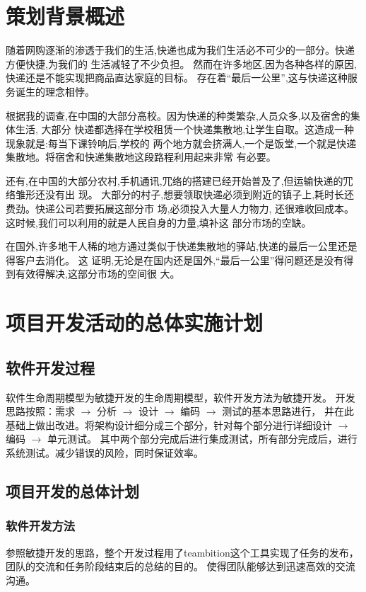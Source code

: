 \documentclass[UTF8]{dingo}
\begin{document}
  \section{策划背景概述}
    随着网购逐渐的渗透于我们的生活,快递也成为我们生活必不可少的一部分。快递方便快捷,为我们的 生活减轻了不少负担。
    然而在许多地区,因为各种各样的原因,快递还是不能实现把商品直达家庭的目标。
    存在着“最后一公里”,这与快递这种服务诞生的理念相悖。

    根据我的调查,在中国的大部分高校。因为快递的种类繁杂,人员众多,以及宿舍的集体生活,
    大部分 快递都选择在学校租赁一个快递集散地,让学生自取。这造成一种现象就是:每当下课铃响后,学校的
    两个地方就会挤满人,一个是饭堂,一个就是快递集散地。将宿舍和快递集散地这段路程利用起来非常 有必要。

    还有,在中国的大部分农村,手机通讯,⺴络的搭建已经开始普及了,但运输快递的⺴络雏形还没有出 现。
    大部分的村子,想要领取快递必须到附近的镇子上,耗时⻓还费劲。快递公司若要拓展这部分市 场,必须投入大量人力物力,
    还很难收回成本。这时候,我们可以利用的就是人民自身的力量,填补这 部分市场的空缺。

    在国外,许多地干人稀的地方通过类似于快递集散地的驿站,快递的最后一公里还是得客户去消化。
    这 证明,无论是在国内还是国外,“最后一公里”得问题还是没有得到有效得解决,这部分市场的空间很 大。

  \section{项目开发活动的总体实施计划}
    \subsection{软件开发过程}
      软件生命周期模型为敏捷开发的生命周期模型，软件开发方法为敏捷开发。
      开发思路按照：需求 $\rightarrow$ 分析  $\rightarrow$ 设计  $\rightarrow$ 编码  $\rightarrow$ 测试的基本思路进行，
      并在此基础上做出改进。将架构设计细分成三个部分，针对每个部分进行详细设计 $\rightarrow$ 编码 $\rightarrow$ 单元测试。
      其中两个部分完成后进行集成测试，所有部分完成后，进行系统测试。减少错误的风险，同时保证效率。
    \subsection{项目开发的总体计划}
      \subsubsection{软件开发方法}
        参照敏捷开发的思路，整个开发过程用了teambition这个工具实现了任务的发布，团队的交流和任务阶段结束后的总结的目的。
        使得团队能够达到迅速高效的交流沟通。
\end{document}
